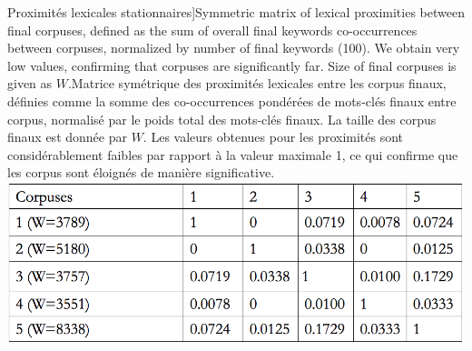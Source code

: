 


\begin{table}
\caption[Stationary lexical proximities][Proximités lexicales stationnaires]{Symmetric matrix of lexical proximities between final corpuses, defined as the sum of overall final keywords co-occurrences between corpuses, normalized by number of final keywords (100). We obtain very low values, confirming that corpuses are significantly far. Size of final corpuses is given as $W$.\label{tab:quantepistemo:lexical}}{Matrice symétrique des proximités lexicales entre les corpus finaux, définies comme la somme des co-occurrences pondérées de mots-clés finaux entre corpus, normalisé par le poids total des mots-clés finaux. La taille des corpus finaux est donnée par $W$. Les valeurs obtenues pour les proximités sont considérablement faibles par rapport à la valeur maximale 1, ce qui confirme que les corpus sont éloignés de manière significative.\label{tab:quantepistemo:lexical}}
\includegraphics[width=0.8\linewidth]{Figures/QuantEpistemo/corpusesDistances}
\end{table}









